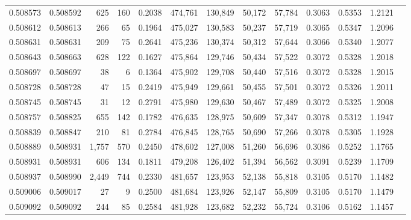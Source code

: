 \begin{tabular}{rrrrrrrrrrrrr}
0.508573 & 0.508592 &   625 &   160 &                                     0.2038 & 474,761 & 130,849 &  50,172 &  57,784 & 0.3063 & 0.5353 & 1.2121 \\
0.508612 & 0.508613 &   266 &    65 &                                     0.1964 & 475,027 & 130,583 &  50,237 &  57,719 & 0.3065 & 0.5347 & 1.2096 \\
0.508631 & 0.508631 &   209 &    75 &                                     0.2641 & 475,236 & 130,374 &  50,312 &  57,644 & 0.3066 & 0.5340 & 1.2077 \\
0.508643 & 0.508663 &   628 &   122 &                                     0.1627 & 475,864 & 129,746 &  50,434 &  57,522 & 0.3072 & 0.5328 & 1.2018 \\
0.508697 & 0.508697 &    38 &     6 &                                     0.1364 & 475,902 & 129,708 &  50,440 &  57,516 & 0.3072 & 0.5328 & 1.2015 \\
0.508728 & 0.508728 &    47 &    15 &                                     0.2419 & 475,949 & 129,661 &  50,455 &  57,501 & 0.3072 & 0.5326 & 1.2011 \\
0.508745 & 0.508745 &    31 &    12 &                                     0.2791 & 475,980 & 129,630 &  50,467 &  57,489 & 0.3072 & 0.5325 & 1.2008 \\
0.508757 & 0.508825 &   655 &   142 &                                     0.1782 & 476,635 & 128,975 &  50,609 &  57,347 & 0.3078 & 0.5312 & 1.1947 \\
0.508839 & 0.508847 &   210 &    81 &                                     0.2784 & 476,845 & 128,765 &  50,690 &  57,266 & 0.3078 & 0.5305 & 1.1928 \\
0.508889 & 0.508931 & 1,757 &   570 &                                     0.2450 & 478,602 & 127,008 &  51,260 &  56,696 & 0.3086 & 0.5252 & 1.1765 \\
0.508931 & 0.508931 &   606 &   134 &                                     0.1811 & 479,208 & 126,402 &  51,394 &  56,562 & 0.3091 & 0.5239 & 1.1709 \\
0.508937 & 0.508990 & 2,449 &   744 &                                     0.2330 & 481,657 & 123,953 &  52,138 &  55,818 & 0.3105 & 0.5170 & 1.1482 \\
0.509006 & 0.509017 &    27 &     9 &                                     0.2500 & 481,684 & 123,926 &  52,147 &  55,809 & 0.3105 & 0.5170 & 1.1479 \\
0.509092 & 0.509092 &   244 &    85 &                                     0.2584 & 481,928 & 123,682 &  52,232 &  55,724 & 0.3106 & 0.5162 & 1.1457 \\

\end{tabular}
